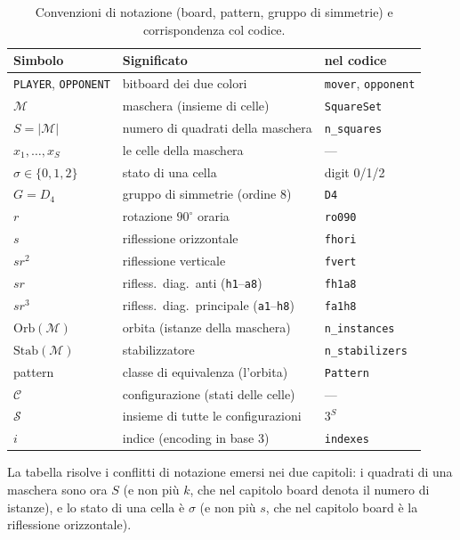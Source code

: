 \begin{table}[h]
\centering
\small
\caption{Convenzioni di notazione (board, pattern, gruppo di simmetrie) e corrispondenza col codice.}
\label{tab:notation_conventions}
\begin{tabular}{@{}lll@{}}
\toprule
\textbf{Simbolo} & \textbf{Significato} & \textbf{nel codice} \\
\midrule
\texttt{PLAYER}, \texttt{OPPONENT} & bitboard dei due colori & \texttt{mover}, \texttt{opponent} \\
$\mathcal{M}$ & maschera (insieme di celle) & \texttt{SquareSet} \\
$S = |\mathcal{M}|$ & numero di quadrati della maschera & \texttt{n\_squares} \\
$x_1, \dots, x_S$ & le celle della maschera & --- \\
$\sigma \in \{0,1,2\}$ & stato di una cella & digit 0/1/2 \\
\midrule
$G = D_4$ & gruppo di simmetrie (ordine 8) & \texttt{D4} \\
$r$ & rotazione $90^\circ$ oraria & \texttt{ro090} \\
$s$ & riflessione orizzontale & \texttt{fhori} \\
$sr^2$ & riflessione verticale & \texttt{fvert} \\
$sr$ & rifless.\ diag.\ anti (\texttt{h1}--\texttt{a8}) & \texttt{fh1a8} \\
$sr^3$ & rifless.\ diag.\ principale (\texttt{a1}--\texttt{h8}) & \texttt{fa1h8} \\
\midrule
$\text{Orb}(\mathcal{M})$ & orbita (istanze della maschera) & \texttt{n\_instances} \\
$\text{Stab}(\mathcal{M})$ & stabilizzatore & \texttt{n\_stabilizers} \\
pattern & classe di equivalenza (l'orbita) & \texttt{Pattern} \\
$\mathcal{C}$ & configurazione (stati delle celle) & --- \\
$\mathcal{S}$ & insieme di tutte le configurazioni & $3^S$ \\
$i$ & indice (encoding in base 3) & \texttt{indexes} \\
\bottomrule
\end{tabular}
\end{table}

La tabella risolve i conflitti di notazione emersi nei due capitoli: i quadrati di una maschera sono ora
$S$ (e non più $k$, che nel capitolo board denota il numero di istanze), e lo stato di una cella è $\sigma$
(e non più $s$, che nel capitolo board è la riflessione orizzontale).

